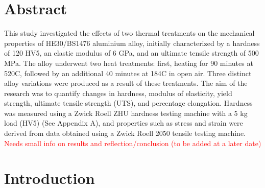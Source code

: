\documentclass{article}
\begin{document}
    \newpage\vspace*{-20pt}\large

    \section{Abstract}
    \vspace*{1em}
    This study investigated the effects of two thermal treatments on the mechanical properties of HE30/BS1476 aluminium alloy, initially characterized by a hardness of 120 HV5, an elastic modulus of 6 GPa, and an ultimate tensile strength of 500 MPa. The alloy underwent two heat treatments: first, heating for 90 minutes at 520\textdegree C, followed by an additional 40 minutes at 184\textdegree C in open air. Three distinct alloy variations were produced as a result of these treatments. The aim of the research was to quantify changes in hardness, modulus of elasticity, yield strength, ultimate tensile strength (UTS), and percentage elongation. Hardness was measured using a Zwick Roell ZHU hardness testing machine with a 5 kg load (HV5) (See Appendix A), and properties such as stress and strain were derived from data obtained using a Zwick Roell 2050 tensile testing machine.\\[1em]
    \textcolor{red}{Needs small info on results and reflection/conclusion (to be added at a later date)}
   
    
    \newpage\vspace*{-20pt}
    \section{Introduction}
\end{document}
